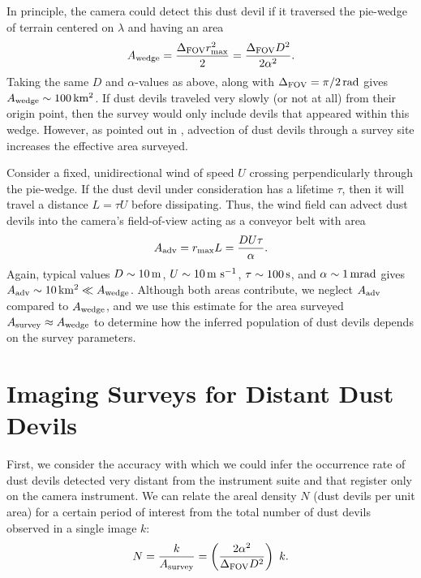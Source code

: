 \documentclass{aastex63}
\begin{document}
In principle, the camera could detect this dust devil if it traversed the pie-wedge of terrain centered on $\lambda$ and having an area 
\begin{equation}
    A_{\rm wedge} = \frac{\Delta_{\rm FOV} r_{\rm max}^2}{2} = \frac{\Delta_{\rm FOV}D^2}{2 \alpha^2}.
    \label{eqn:A_wedge}
\end{equation}
Taking the same $D$ and $\alpha$-values as above, along with $\Delta_{\rm FOV} = \pi/2\,{\rm rad}$ gives $A_{\rm wedge} \sim 100\,{\rm km^2}$. If dust devils traveled very slowly (or not at all) from their origin point, then the survey would only include devils that appeared within this wedge. However, as pointed out in \citet{2014JAtS...71.4461L}, advection of dust devils through a survey site increases the effective area surveyed. 

Consider a fixed, unidirectional wind of speed $U$ crossing perpendicularly through the pie-wedge. If the dust devil under consideration has a lifetime $\tau$, then it will travel a distance $L = \tau U$ before dissipating. Thus, the wind field can advect dust devils into the camera's field-of-view acting as a conveyor belt with area
\begin{equation}
    A_{\rm adv} = r_{\rm max} L = \frac{D U \tau}{\alpha}.
    \label{eqn:A_adv}
\end{equation}
Again, typical values $D \sim 10\,{\rm m}$, $U \sim 10\,{\rm m\ s^{-1}}$, $\tau \sim 100\,{\rm s}$, and $\alpha \sim 1\,{\rm mrad}$ gives $A_{\rm adv} \sim 10\,{\rm km^2} \ll A_{\rm wedge}$. Although both areas contribute, we neglect $A_{\rm adv}$ compared to $A_{\rm wedge}$, and we use this estimate for the area surveyed $A_{\rm survey} \approx A_{\rm wedge}$ to determine how the inferred population of dust devils depends on the survey parameters.

\section{Imaging Surveys for Distant Dust Devils}
First, we consider the accuracy with which we could infer the occurrence rate of dust devils detected very distant from the instrument suite and that register only on the camera instrument. We can relate the areal density $N$ (dust devils per unit area) for a certain period of interest from the total number of dust devils observed in a single image $k$:
\begin{equation}
   N = \frac{k}{A_{\rm survey}} = \left( \frac{2 \alpha^2}{\Delta_{\rm FOV} D^2} \right)\ k.
    \label{eqn:areal_occurrence}
\end{equation}
\end{document}
